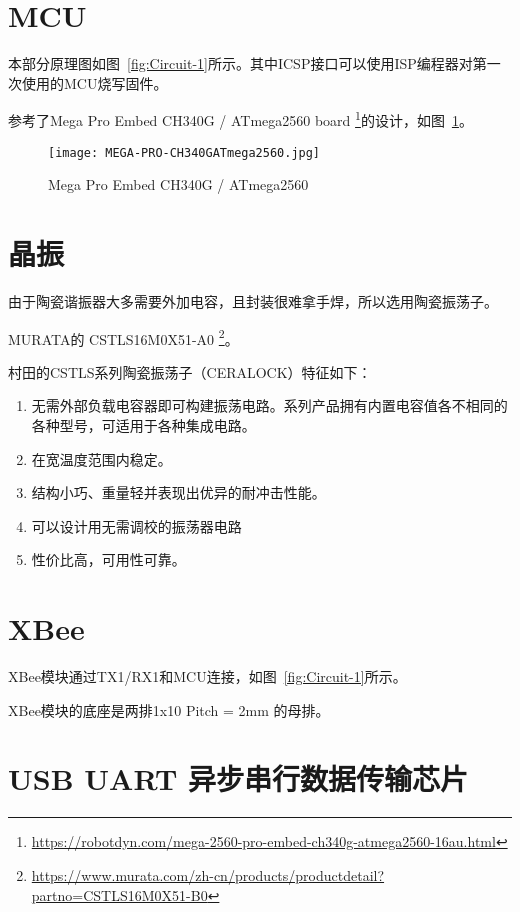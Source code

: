 \section{MCU}

本部分原理图如图~\ref{fig:Circuit-1}所示。其中ICSP接口可以使用ISP编程器对第一次使用的MCU烧写固件。

参考了Mega Pro Embed CH340G / ATmega2560 board \footnote{\url{https://robotdyn.com/mega-2560-pro-embed-ch340g-atmega2560-16au.html}}的设计，如图~\ref{fig:MEGA-PRO-CH340GATmega2560}。

\begin{figure}[htbp]
    \centering
    \texttt{[image: MEGA-PRO-CH340GATmega2560.jpg]}
    \caption{Mega Pro Embed CH340G / ATmega2560}
    \label{fig:MEGA-PRO-CH340GATmega2560}
\end{figure}


\section{晶振}

由于陶瓷谐振器大多需要外加电容，且封装很难拿手焊，所以选用陶瓷振荡子。

MURATA的 CSTLS16M0X51-A0 \footnote{\url{https://www.murata.com/zh-cn/products/productdetail?partno=CSTLS16M0X51-B0}}。

村田的CSTLS系列陶瓷振荡子（CERALOCK）特征如下：

\begin{enumerate}
    \item 无需外部负载电容器即可构建振荡电路。系列产品拥有内置电容值各不相同的各种型号，可适用于各种集成电路。
    \item 在宽温度范围内稳定。
    \item 结构小巧、重量轻并表现出优异的耐冲击性能。
    \item 可以设计用无需调校的振荡器电路
    \item 性价比高，可用性可靠。
\end{enumerate}

\section{XBee}

XBee模块通过TX1/RX1和MCU连接，如图~\ref{fig:Circuit-1}所示。

XBee模块的底座是两排1x10 Pitch = 2mm 的母排。

\section{USB UART 异步串行数据传输芯片}

